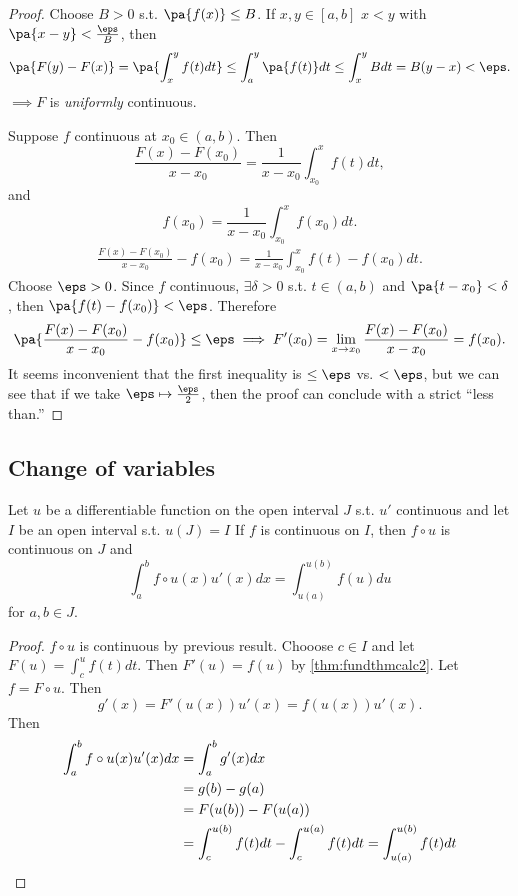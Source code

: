 \documentclass[11pt]{scrartcl}
\numberwithin{equation}{section}
\begin{document}
\begin{proof}
    Choose $B>0$ s.t. $\pa{f(x)}\leq B$. If $x,y\in [a,b]$ $x<y$ with 
    $\pa{x-y} < \frac{\eps}{B}$, then 
    \[
        \pa{F(y)-F(x)} = \pa{\int_{x}^{y}f(t)dt} \leq \int_{a}^{y}\pa{f(t)}dt \leq \int_{x}^{y}Bdt = B(y-x) < \eps.
    \]
    $\implies F$ is \textit{uniformly} continuous.

    Suppose $f$ continuous at $x_0\in(a,b)$. Then 
    \[
        \frac{F(x)-F(x_0)}{x-x_0} = \frac{1}{x-x_0}\int_{x_0}^{x}f(t)dt,
    \]
    and
    \[
        f(x_0) = \frac{1}{x-x_0}\int_{x_0}^{x}f(x_0)dt.
    \]
    \begin{align*}
        \frac{F(x) - F(x_0)}{x-x_0} - f(x_0) = \frac{1}{x-x_0}\int_{x_0}^{x}f(t)-f(x_0)dt.
    \end{align*}
    Choose $\eps>0$. Since $f$ continuous, $\exists \delta>0$ s.t. 
    $t\in(a,b)$ and $\pa{t-x_0} < \delta$, then $\pa{f(t)-f(x_0)}<\eps$.
    Therefore 
    \[
        \pa{\frac{F(x)-F(x_0)}{x-x_0}-f(x_0)} \leq \eps 
        \implies 
        F'(x_0) = \lim_{x\rightarrow x_0}\frac{F(x)-F(x_0)}{x-x_0} = f(x_0).
    \]
    It seems inconvenient that the first inequality is $\leq \eps$ vs. 
    $<\eps$, but we can see that if we take $\eps\mapsto \frac{\eps}{2}$, then 
    the proof can conclude with a strict ``less than.''
\end{proof}

\subsection{Change of variables}
\begin{theorem}
    \label{thm:changevars}
    Let $u$ be a differentiable function on the open interval $J$ s.t. 
    $u'$ continuous and let $I$ be an open interval s.t. $u(J)= I$ 
    If $f$ is continuous on $I$, then $f \circ u$ is continuous on $J$ 
    and
    \[
        \int_{a}^{b}f\circ u(x) u'(x)dx = \int_{u(a)}^{u(b)}f(u)du 
    \]
    for $a,b\in J$.
\end{theorem}

\begin{proof}
    $f \circ u $ is continuous by previous result. Chooose $c\in I$ and 
    let $F(u) = \int_{c}^{u}f(t)dt$. Then $F'(u)=f(u)$ by 
    \cref{thm:fundthmcalc2}. Let $f=F\circ u$. Then 
    \[
        g'(x) = F'(u(x))u'(x) = f(u(x))u'(x).
    \]
    Then 
    \begin{align*}
        \int_{a}^{b}f\circ u(x)u'(x)dx &= \int_{a}^{b}g'(x)dx  \\
        &= g(b)-g(a) \\
        &= F(u(b))-F(u(a)) \\
        &= \int_{c}^{u(b)}f(t)dt - \int_{c}^{u(a)}f(t)dt = \int_{u(a)}^{u(b)}f(t)dt \qedhere
    \end{align*}
\end{proof}
\end{document}
